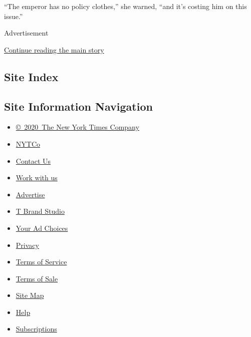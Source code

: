 ``The emperor has no policy clothes,'' she warned, ``and it's costing
him on this issue.''

Advertisement

\protect\hyperlink{after-bottom}{Continue reading the main story}

\hypertarget{site-index}{%
\subsection{Site Index}\label{site-index}}

\hypertarget{site-information-navigation}{%
\subsection{Site Information
Navigation}\label{site-information-navigation}}

\begin{itemize}
\tightlist
\item
  \href{https://help.nytimes.com/hc/en-us/articles/115014792127-Copyright-notice}{©~2020~The
  New York Times Company}
\end{itemize}

\begin{itemize}
\tightlist
\item
  \href{https://www.nytco.com/}{NYTCo}
\item
  \href{https://help.nytimes.com/hc/en-us/articles/115015385887-Contact-Us}{Contact
  Us}
\item
  \href{https://www.nytco.com/careers/}{Work with us}
\item
  \href{https://nytmediakit.com/}{Advertise}
\item
  \href{http://www.tbrandstudio.com/}{T Brand Studio}
\item
  \href{https://www.nytimes.com/privacy/cookie-policy\#how-do-i-manage-trackers}{Your
  Ad Choices}
\item
  \href{https://www.nytimes.com/privacy}{Privacy}
\item
  \href{https://help.nytimes.com/hc/en-us/articles/115014893428-Terms-of-service}{Terms
  of Service}
\item
  \href{https://help.nytimes.com/hc/en-us/articles/115014893968-Terms-of-sale}{Terms
  of Sale}
\item
  \href{https://spiderbites.nytimes.com}{Site Map}
\item
  \href{https://help.nytimes.com/hc/en-us}{Help}
\item
  \href{https://www.nytimes.com/subscription?campaignId=37WXW}{Subscriptions}
\end{itemize}
